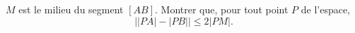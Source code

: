 $M$ est le milieu du segment $[AB]$. Montrer que, pour tout point $P$ de l'espace,
\[ \big||PA| - |PB|\big| \leq 2|PM|. \]
